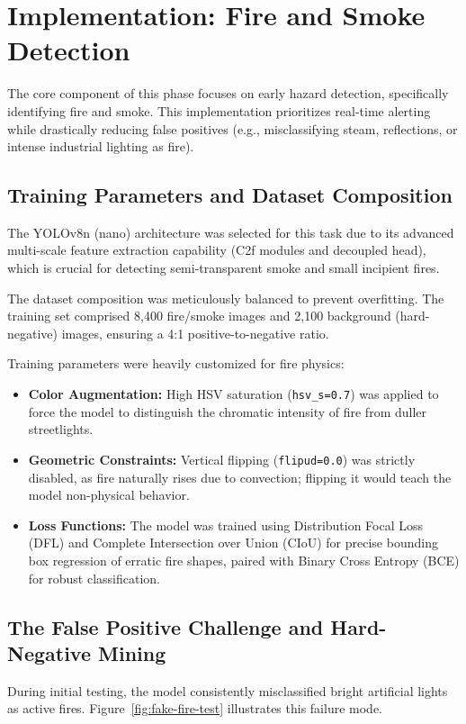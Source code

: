 \section{Implementation: Fire and Smoke Detection}
\label{sec:fire-smoke-implementation}

The core component of this phase focuses on early hazard detection, specifically identifying fire and smoke. This implementation prioritizes real-time alerting while drastically reducing false positives (e.g., misclassifying steam, reflections, or intense industrial lighting as fire).

\subsection{Training Parameters and Dataset Composition}
The YOLOv8n (nano) architecture was selected for this task due to its advanced multi-scale feature extraction capability (C2f modules and decoupled head), which is crucial for detecting semi-transparent smoke and small incipient fires. 

The dataset composition was meticulously balanced to prevent overfitting. The training set comprised 8,400 fire/smoke images and 2,100 background (hard-negative) images, ensuring a 4:1 positive-to-negative ratio.

Training parameters were heavily customized for fire physics:
\begin{itemize}
    \item \textbf{Color Augmentation:} High HSV saturation (\texttt{hsv\_s=0.7}) was applied to force the model to distinguish the chromatic intensity of fire from duller streetlights.
    \item \textbf{Geometric Constraints:} Vertical flipping (\texttt{flipud=0.0}) was strictly disabled, as fire naturally rises due to convection; flipping it would teach the model non-physical behavior.
    \item \textbf{Loss Functions:} The model was trained using Distribution Focal Loss (DFL) and Complete Intersection over Union (CIoU) for precise bounding box regression of erratic fire shapes, paired with Binary Cross Entropy (BCE) for robust classification.
\end{itemize}

\subsection{The False Positive Challenge and Hard-Negative Mining}
During initial testing, the model consistently misclassified bright artificial lights as active fires. Figure~\ref{fig:fake-fire-test} illustrates this failure mode.

